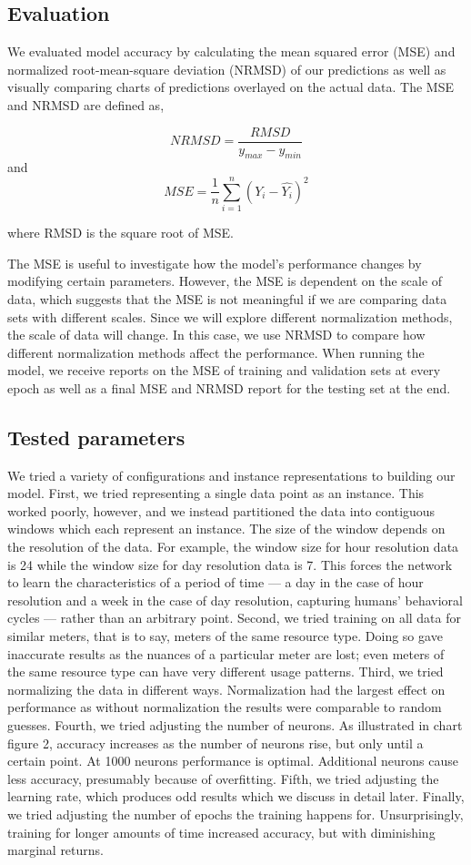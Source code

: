 \documentclass[letterpaper, 11 pt, conference]{ieeeconf}  %
\begin{document}
\subsection{Evaluation}

We evaluated model accuracy by calculating the mean squared error (MSE) and normalized root-mean-square deviation (NRMSD) of our predictions as well as visually comparing charts of predictions overlayed on the actual data. The MSE and NRMSD are defined as,

$$
NRMSD = \frac{RMSD}{y_{max} - y_{min}}
$$
and
$$
MSE = \frac{1}{n} \sum_{i=1}^{n} (Y_i - \hat{Y_i})^2
$$

where RMSD is the square root of MSE. 

The MSE is useful to investigate how the model’s performance changes by modifying certain parameters. However, the MSE is dependent on the scale of data, which suggests that the MSE is not meaningful if we are comparing data sets with different scales. Since we will explore different normalization methods, the scale of data will change. In this case, we use NRMSD to compare how different normalization methods affect the performance. When running the model, we receive reports on the MSE of training and validation sets at every epoch as well as a final MSE and NRMSD report for the testing set at the end. 


\subsection{Tested parameters}

We tried a variety of configurations and instance representations to building our model. First, we tried representing a single data point as an instance. This worked poorly, however, and we instead partitioned the data into contiguous windows which each represent an instance. The size of the window depends on the resolution of the data. For example, the window size for hour resolution data is 24 while the window size for day resolution data is 7. This forces the network to learn the characteristics of a period of time — a day in the case of hour resolution and a week in the case of day resolution, capturing humans’ behavioral cycles — rather than an arbitrary point. Second, we tried training on all data for similar meters, that is to say, meters of the same resource type. Doing so gave inaccurate results as the nuances of a particular meter are lost; even meters of the same resource type can have very different usage patterns. Third, we tried normalizing the data in different ways. Normalization had the largest effect on performance as without normalization the results were comparable to random guesses. Fourth, we tried adjusting the number of neurons. As illustrated in chart figure 2, accuracy increases as the number of neurons rise, but only until a certain point. At 1000 neurons performance is optimal. Additional neurons cause less accuracy, presumably because of overfitting. Fifth, we tried adjusting the learning rate, which produces odd results which we discuss in detail later. Finally, we tried adjusting the number of epochs the training happens for. Unsurprisingly, training for longer amounts of time increased accuracy, but with diminishing marginal returns.
\end{document}
